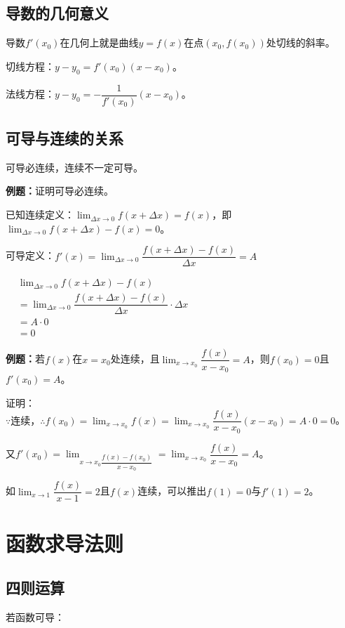 \documentclass[UTF8, 12pt]{ctexart}
\begin{document}
\subsection{导数的几何意义}

导数$f'(x_0)$在几何上就是曲线$y=f(x)$在点$(x_0,f(x_0))$处切线的斜率。

切线方程：$y-y_0=f'(x_0)(x-x_0)$。

法线方程：$y-y_0=-\dfrac{1}{f'(x_0)}(x-x_0)$。

\subsection{可导与连续的关系}

可导必连续，连续不一定可导。

\textbf{例题：}证明可导必连续。

已知连续定义：$\lim_{\Delta x\to 0}f(x+\Delta x)=f(x)$，即$\lim_{\Delta x\to 0}f(x+\Delta x)-f(x)=0$。

可导定义：$f'(x)=\lim_{\Delta x\to 0}\dfrac{f(x+\Delta x)-f(x)}{\Delta x} = A$

$
\begin{aligned}
    & \lim_{\Delta x\to 0}f(x+\Delta x)-f(x) \\
    & =\lim_{\Delta x\to 0}\dfrac{f(x+\Delta x)-f(x)}{\Delta x}\cdot\Delta x \\
    & =A\cdot 0 \\
    & =0
\end{aligned}
$

\textbf{例题：}若$f(x)$在$x=x_0$处连续，且$\lim_{x\to x_0}\dfrac{f(x)}{x-x_0}=A$，则$f(x_0)=0$且$f'(x_0)=A$。

证明：$\because\text{连续，}\therefore f(x_0)=\lim_{x\to x_0}f(x)=\lim_{x\to x_0}\dfrac{f(x)}{x-x_0}(x-x_0)=A\cdot 0=0$。

又$f'(x_0)=\lim_{x\to x_0\dfrac{f(x)-f(x_0)}{x-x_0}}=\lim_{x\to x_0}\dfrac{f(x)}{x-x_0}=A$。

如$\lim_{x\to 1}\dfrac{f(x)}{x-1}=2$且$f(x)$连续，可以推出$f(1)=0$与$f'(1)=2$。


\section{函数求导法则}

\subsection{四则运算}

若函数可导：
\end{document}
